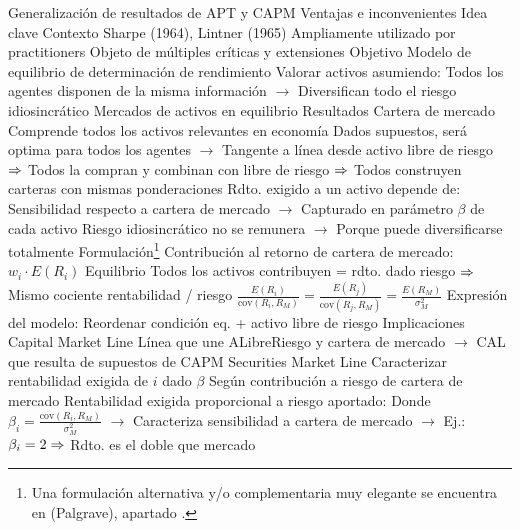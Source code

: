 \documentclass{nuevotema}
\begin{document}
\begin{esquemal}
				\4 Generalización de resultados de APT y CAPM
				\4 Ventajas e inconvenientes
	\1 
		\2 Idea clave
			\3 Contexto
				\4 Sharpe (1964), Lintner (1965)
				\4 Ampliamente utilizado por practitioners
				\4 Objeto de múltiples críticas y extensiones
			\3 Objetivo
				\4 Modelo de equilibrio de determinación de rendimiento
				\4 Valorar activos asumiendo:
				\4[] Todos los agentes disponen de la misma información
				\4[] $\to$ Diversifican todo el riesgo idiosincrático
				\4[] Mercados de activos en equilibrio
			\3 Resultados
				\4 Cartera de mercado
				\4[] Comprende todos los activos relevantes en economía
				\4[] Dados supuestos, será optima para todos los agentes
				\4[] $\to$ Tangente a línea desde activo libre de riesgo
				\4[] $\Rightarrow$ Todos la compran y combinan con libre de riesgo
				\4[] $\Rightarrow$ Todos construyen carteras con mismas ponderaciones
				\4 Rdto. exigido a un activo depende de:
				\4[] Sensibilidad respecto a cartera de mercado
				\4[] $\to$ Capturado en parámetro $\beta$ de cada activo
				\4[] Riesgo idiosincrático no se remunera
				\4[] $\to$ Porque puede diversificarse totalmente
		\2 Formulación\footnote{Una formulación alternativa y/o complementaria muy elegante se encuentra en  (Palgrave), apartado .}
			\3 Contribución al retorno de cartera de mercado:
				\4 $w_i \cdot E(R_i)$
			\3 Equilibrio
				\4 Todos los activos contribuyen = rdto. dado riesgo
				\4[] $\Rightarrow$ Mismo cociente rentabilidad / riesgo
				\4 $\frac{E(R_i)}{\text{cov}(R_i, R_M)} = \frac{E(R_j)}{\text{cov}(R_j, R_M)} = \frac{E(R_M)}{\sigma_M^2}$
			\3 Expresión del modelo:
				\4 Reordenar condición eq. + activo libre de riesgo
				\4[] 
		\2 Implicaciones
			\3 Capital Market Line
				\4 Línea que une ALibreRiesgo y cartera de mercado
				\4[] $\to$ CAL que resulta de supuestos de CAPM
			\3 Securities Market Line
				\4 Caracterizar rentabilidad exigida de $i$ dado $\beta$
				\4[] Según contribución a riesgo de cartera de mercado
				\4[] Rentabilidad exigida proporcional a riesgo aportado:
				\4[] 
				\4[] Donde $\beta_i = \frac{\text{cov}(R_i, R_M)}{\sigma_M^2} $
				\4[] $\to$ Caracteriza sensibilidad a cartera de mercado
				\4[] $\to$ Ej.: $\beta_i=2 \Rightarrow$ Rdto. es el doble que mercado

\end{esquemal}
\end{document}
